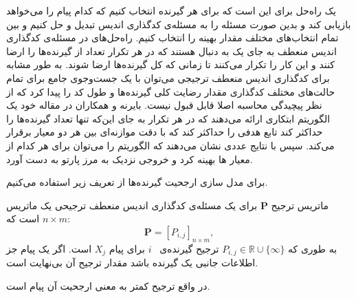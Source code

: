  یک راه‌حل 
 برای 
 \picod
  این است که برای هر گیرنده انتخاب کنیم که کدام پیام را می‌خواهد بازیابی کند و بدین صورت مسئله را به مسئله‌ی کدگذاری اندیس تبدیل و حل کنیم و بین تمام انتخاب‌های مختلف مقدار بهینه را انتخاب کنیم.  راه‌حل‌های
 در مسئله‌ی کدگذاری اندیس منعطف به جای یک 
به دنبال 
هستند که در هر تکرار تعداد
از گیرنده‌ها را ارضا کنند و این کار را تکرار می‌کنند تا زمانی که کل گیرنده‌ها ارضا شوند. به طور مشابه برای کدگذاری اندیس منعطف ترجیجی می‌توان با یک جست‌وجوی جامع برای تمام حالت‌های مختلف کدگذاری مقدار رضایت کلی گیرنده‌ها و طول کد را پیدا کرد که از نظر پیچیدگی محاسبه اصلا قابل قبول نیست. بایرنه و همکاران در مقاله خود یک الگوریتم ابتکاری ارائه می‌دهند که در هر تکرار به جای این‌که تنها تعداد گیرنده‌ها را حداکثر کند تابع هدفی را حداکثر کند که با دقت موازنه‌ای بین هر دو معیار برقرار می‌کند. سپس با نتایج عددی نشان می‌دهند که الگوریتم را می‌توان برای هر کدام از معیار ها بهینه کرد و خروجی نزدیک به مرز پارتو به دست آورد.

برای مدل سازی ارجحیت گیرنده‌ها از تعریف زیر استفاده می‌کنیم.
\begin{definition}
	ماتریس ترجیح
	$\boldsymbol{P}$ 
	برای یک مسئله‌ی کدگذاری اندیس منعطف ترجیحی یک ماتریس
	 $n\times m$
	 است که:
	\begin{equation}
		\boldsymbol{P} = [P_{i,j}]_{n\times m},
	\end{equation}
	به طوری که
	 $P_{i,j}\in\mathbb{R}\cup\{\infty\}$ 
	 ترجیح گیرنده‌ی
	 ~$i$
	 برای پیام
	  $X_j$
	  است.
	اگر یک پیام جز اطلاعات جانبی یک گیرنده باشد مقدار ترجیح آن بی‌نهایت است.
	
	در واقع ترجیح کمتر به معنی ارجحیت آن پیام است.
\end{definition}

